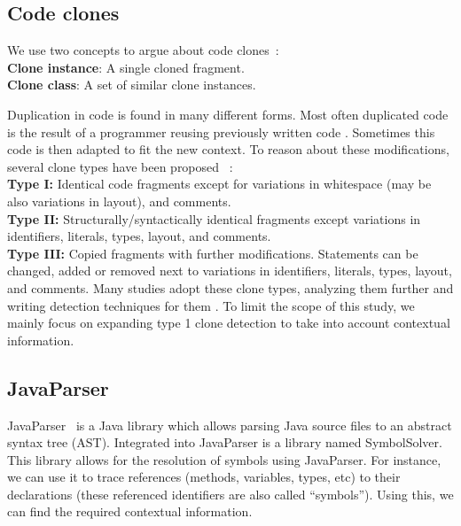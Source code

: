 \documentclass[journal]{IEEEtran}
\begin{document}
\subsection{Code clones}
We use two concepts to argue about code clones~\cite{roy2007survey}:
\\ \textbf{Clone instance}: A single cloned fragment.
\\ \textbf{Clone class}: A set of similar clone instances.

Duplication in code is found in many different forms. Most often duplicated code is the result of a programmer reusing previously written code \cite{haefliger2008code, baxter1998clone}. Sometimes this code is then adapted to fit the new context. To reason about these modifications, several clone types have been proposed%
~\cite{roy2007survey}:\\
\textbf{Type I:} Identical code fragments except for variations in whitespace (may be also variations in layout), and comments.\\
\textbf{Type II:} Structurally/syntactically identical fragments except variations in identifiers, literals, types, layout, and comments.\\
\textbf{Type III:} Copied fragments with further modifications. Statements can be changed, added or removed next to variations in identifiers, literals, types, layout, and comments.
Many studies adopt these clone types, analyzing them further and writing detection techniques for them \cite{sajnani2016sourcerercc, kodhai2010detection, van2019novel}. To limit the scope of this study, we mainly focus on expanding type 1 clone detection to take into account contextual information.

\subsection{JavaParser}
JavaParser~\cite{tomassetti2017javaparser} is a Java library which allows parsing Java source files to an abstract syntax tree (AST). Integrated into JavaParser is a library named SymbolSolver. This library allows for the resolution of symbols using JavaParser. For instance, we can use it to trace references (methods, variables, types, etc) to their declarations (these referenced identifiers are also called ``symbols''). Using this, we can find the required contextual information.
\end{document}
